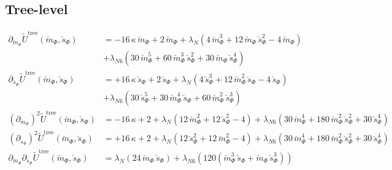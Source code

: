 \subsection*{Tree-level}
\begin{align}\label{CEP_derivative_dm_treeLevel_rescaled}
 \partial_{\breve m_{\Phi}} \tilde U^{\text{tree}}(\breve m_{\Phi}, \breve s_{\Phi})& =
                           - 16 \,\kappa\, \breve m_{\Phi} + 2\, \breve m_{\Phi} 
                           + \lambda_N \left( 4\, \breve m_{\Phi}^3 + 12 \,\breve m_{\Phi} \, \breve s_{\Phi}^2 - 4\, \breve m_{\Phi} \right)
         \nonumber \\
                         & + \lambda_{N6}\left( 30\, \breve m_{\Phi}^5 + 60\, \breve m_{\Phi}^3\, \breve s_{\Phi}^2 + 30\, \breve m_{\Phi}\, \breve s_{\Phi}^4 \right)
%                     
         \\ \label{eq:CEP_derivative_ds_treeLevel_rescaled}
 \partial_{\breve s_{\Phi}}   \tilde U^{\text{tree}}(\breve m_{\Phi}, \breve s_{\Phi}) & =
                    +16 \,\kappa\, \breve s_{\Phi} + 2\, \breve s_{\Phi} 
                    + \lambda_N \left( 4\, \breve s_{\Phi}^3 + 12\, \breve m_{\Phi}^2\, \breve s_{\Phi} -4\, \breve s_{\Phi} \right)
         \nonumber \\
                  & + \lambda_{N6}\left( 30\, \breve s_{\Phi}^5 + 30\, \breve m_{\Phi}^4\, \breve s_{\Phi} + 60\, \breve m_{\Phi}^2\, \breve s_{\Phi}^3 \right)
%          
         \\ \label{eq:CEP_derivative_dmdm_treeLevel_rescaled}
 \left(\partial_{\breve m_{\Phi}}\right)^2   \tilde U^{\text{tree}}(\breve m_{\Phi}, \breve s_{\Phi}) & =
                    - 16\, \kappa  + 2 + \lambda_N \left( 12\, \breve m_{\Phi}^2 + 12\, \breve s_{\Phi}^2 - 4 \right)
                    + \lambda_{N6} \left( 30\, \breve m_{\Phi}^4 + 180\, \breve m_{\Phi}^2\, \breve s_{\Phi}^2 + 30\, \breve s_{\Phi}^4 \right)
% 
        \\ \label{eq:CEP_derivative_dsds_treeLevel_rescaled}
 \left(\partial_{\breve s_{\Phi}} \right)^2  \tilde U^{\text{tree}}(\breve m_{\Phi}, \breve s_{\Phi}) & =
                    +16\, \kappa  + 2 + \lambda_N \left( 12\, \breve s_{\Phi}^2 + 12\, \breve m_{\Phi}^2 - 4 \right)
                    + \lambda_{N6} \left( 30\, \breve m_{\Phi}^4 + 180\, \breve m_{\Phi}^2\, \breve s_{\Phi}^2 + 30\, \breve s_{\Phi}^4 \right)
%                     
        \\ \label{eq:CEP_derivative_dmds_treeLevel_rescaled}
 \partial_{\breve m_{\Phi}} \partial_{\breve s_{\Phi}}   \tilde U^{\text{tree}}(\breve m_{\Phi}, \breve s_{\Phi}) & =
                    \lambda_N \left( 24\, \breve m_{\Phi}\, \breve s_{\Phi} \right) 
                    + \lambda_{N6} \left( 120 \left( \breve m_{\Phi}^3\, \breve s_{\Phi} + \breve m_{\Phi}\, \breve s_{\Phi}^3 \right) \right)
\end{align}

